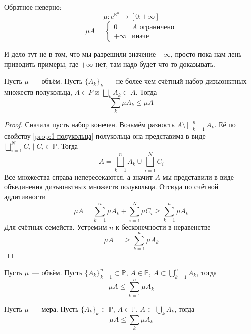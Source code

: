 \documentclass{article}
\begin{document}
    \begin{example}
        Обратное неверно:\\
        $$
        \mu\colon e^{\mathbb R^n}\to[0;+\infty]
        $$
        $$
        \mu A=\begin{cases}
            0 & A\text{ ограничено}\\
            +\infty & \text{иначе}
        \end{cases}
        $$
    \end{example}
    \begin{remark}
        И дело тут не в том, что мы разрешили значение $+\infty$, просто пока нам лень приводить примеры, где $+\infty$ нет, там надо будет что-то доказывать.
    \end{remark}
    \begin{property}
        \label{Сильная монотонность меры}
        Пусть $\mu$~--- объём. Пусть $\{A_k\}_k$~--- не более чем счётный набор дизъюнктных множеств полукольца, $A\in P$ и $\bigsqcup\limits_kA_k\subset A$. Тогда
        $$
        \sum\limits_k\mu A_k\leqslant\mu A
        $$
    \end{property}
    \begin{proof}
        Сначала пусть набор конечен. Возьмём разность $A\setminus\bigsqcup\limits_{k=1}^nA_k$. Её по свойству \ref{prop:1 полукольца} полукольца она представима в виде $\bigsqcup\limits_{i=1}^NC_i\mid C_i\in\mathbb P$. Тогда
        $$
        A=\bigsqcup\limits_{k=1}^nA_k\cup\bigsqcup\limits_{i=1}^NC_i
        $$
        Все множества справа непересекаются, а значит $A$ мы представили в виде объединения дизъюнктных множеств полукольца. Отсюда по счётной аддитивности
        $$
        \mu A=\sum\limits_{k=1}^n\mu A_k+\sum\limits_{i=1}^N\mu C_i\geqslant\sum\limits_{k=1}^n\mu A_k
        $$
        Для счётных семейств. Устремим $n$ к бесконечности в неравенстве
        $$
        \mu A=\geqslant\sum\limits_{k=1}^n\mu A_k
        $$
    \end{proof}
    \begin{property}
        Пусть $\mu$~--- объём. Пусть $\{A_k\}_{k=1}^n\subset\mathbb P$, $A\in\mathbb P$, $A\subset\bigcup\limits_{k=1}^nA_k$, тогда
        $$
        \mu A\leqslant\sum\limits_{k=1}^n\mu A_k
        $$
    \end{property}
    \begin{property}
        Пусть $\mu$~--- мера. Пусть $\{A_k\}_k\subset\mathbb P$, $A\in\mathbb P$, $A\subset\bigcup\limits_kA_k$, тогда
        $$
        \mu A\leqslant\sum\limits_k\mu A_k
        $$
    \end{property}
\end{document}
